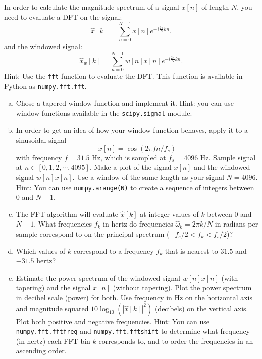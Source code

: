 In order to calculate the magnitude spectrum of a signal $x[n]$ of length $N$, you need to evaluate a DFT on the signal:
\begin{equation}
\hat{x}[k] = \sum_{n=0}^{N-1} x[n] e^{-i\frac{2\pi}{N}kn}.
\label{one}
\end{equation}
and the windowed signal:
\begin{equation}
\hat{x}_w[k] = \sum_{n=0}^{N-1} w[n]x[n] e^{-i\frac{2\pi}{N}kn}.
\end{equation}
Hint: Use the \verb|fft| function to evaluate the
DFT. This function is available in Python as \verb|numpy.fft.fft|.


\begin{enumerate}[a)]
\item Chose a tapered window function and implement it. Hint: you can use window functions available in the \verb|scipy.signal| module.

\item In order to get an idea of how your window function behaves,
  apply it to a sinusoidal signal
\begin{equation}
  x[n]=\cos(2\pi f  n/f_s)
\end{equation}
with frequency $f=31.5$ Hz, which is sampled at $f_s=4096$
Hz. Sample signal at $n\in[0,1,2,\cdots,4095]$. Make a plot of the
signal $x[n]$ and the windowed signal $w[n]x[n]$. Use a window of
the same length as your signal $N=4096$. Hint: You can use \verb|numpy.arange(N)| to create a sequence of integers between $0$ and $N-1$.

\item The FFT algorithm will evaluate $\hat{x}[k]$ at integer values of $k$ between $0$ and $N-1$. What frequencies $f_k$ in hertz do frequencies 
$\hat{\omega}_k = 2\pi k/N$ in radians per sample correspond to on the principal spectrum ($-f_s/2 < f_k < f_s/2$)? 

\item Which values of $k$ correspond to a frequency $f_k$ that is nearest to $31.5$ and $-31.5$ hertz?

\item Estimate the power spectrum of the windowed signal $w[n]x[n]$ (with tapering) and the
  signal $x[n]$ (without tapering). Plot the power spectrum in decibel scale (power) for both.
  Use frequency in Hz on the horizontal axis and magnitude squared
  $10 \log_{10}(|\hat{x}[k]|^2)$ (decibels) on the vertical axis.  Plot both positive and negative frequencies. Hint: You can use \verb|numpy.fft.fftfreq| and \verb|numpy.fft.fftshift| to determine what frequency (in hertz) each FFT bin $k$ corresponds to, and to order the frequencies in an ascending order.


\end{enumerate}
